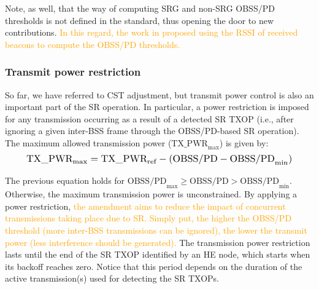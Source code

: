 \documentclass{ieeeaccess}
\begin{document}
Note, as well, that the way of computing SRG and non-SRG OBSS/PD thresholds is not defined in the standard, thus opening the door to new contributions. \textcolor{orange}{In this regard, the work in \cite{tgax2016obss_pd_evaluation} proposed using the RSSI of received beacons to compute the OBSS/PD thresholds.}

\subsubsection{Transmit power restriction}	\label{section:tx_power_restriction}
So far, we have referred to CST adjustment, but transmit power control is also an important part of the SR operation. In particular, a power restriction is imposed for any transmission occurring as a result of a detected SR TXOP (i.e., after ignoring a given inter-BSS frame through the OBSS/PD-based SR operation). The maximum allowed transmission power ($\text{TX\_PWR}_{\max}$) is given by:
\begin{equation}
\resizebox{0.9\columnwidth}{!}{%
	$\text{TX\_PWR}_{\max} = \text{TX\_PWR}_{\text{ref}} - (\text{OBSS/PD} -\text{OBSS/PD}_{\min})$}
\label{eq:power_restriction}
\end{equation}

The previous equation holds for $\text{OBSS/PD}_{\max} \geq \text{OBSS/PD} > \text{OBSS/PD}_{\min}$. Otherwise, the maximum transmission power is unconstrained. By applying a power restriction, \textcolor{orange}{the amendment aims to reduce the impact of concurrent transmissions taking place due to SR. Simply put, the higher the OBSS/PD threshold (more inter-BSS transmissions can be ignored), the lower the transmit power (less interference should be generated).} The transmission power restriction lasts until the end of the SR TXOP identified by an HE node, which starts when its backoff reaches zero. Notice that this period depends on the duration of the active transmission(s) used for detecting the SR TXOPs. 
\end{document}
